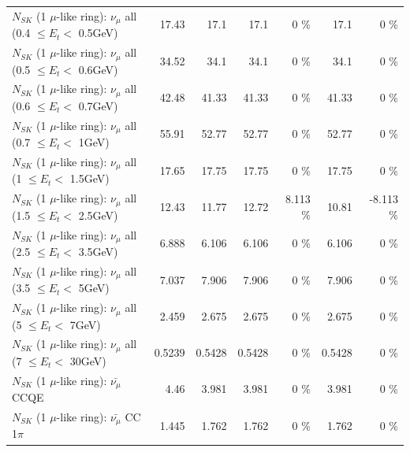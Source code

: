 \begin{table}
\begin{tabular}{| l | r | r | r  r | r  r |}
       $N_{SK}$ (1 $\mu$-like ring): $\nu_{\mu}$ all (0.4 $\leq E_{t} <$ 0.5GeV) &           17.43 &            17.1 &            17.1 &        0 \%  &            17.1 &        0 \%  \\ 
       $N_{SK}$ (1 $\mu$-like ring): $\nu_{\mu}$ all (0.5 $\leq E_{t} <$ 0.6GeV) &           34.52 &            34.1 &            34.1 &        0 \%  &            34.1 &        0 \%  \\ 
       $N_{SK}$ (1 $\mu$-like ring): $\nu_{\mu}$ all (0.6 $\leq E_{t} <$ 0.7GeV) &           42.48 &           41.33 &           41.33 &        0 \%  &           41.33 &        0 \%  \\ 
         $N_{SK}$ (1 $\mu$-like ring): $\nu_{\mu}$ all (0.7 $\leq E_{t} <$ 1GeV) &           55.91 &           52.77 &           52.77 &        0 \%  &           52.77 &        0 \%  \\ 
         $N_{SK}$ (1 $\mu$-like ring): $\nu_{\mu}$ all (1 $\leq E_{t} <$ 1.5GeV) &           17.65 &           17.75 &           17.75 &        0 \%  &           17.75 &        0 \%  \\ 
       $N_{SK}$ (1 $\mu$-like ring): $\nu_{\mu}$ all (1.5 $\leq E_{t} <$ 2.5GeV) &           12.43 &           11.77 &           12.72 &    8.113 \%  &           10.81 &   -8.113 \%  \\ 
       $N_{SK}$ (1 $\mu$-like ring): $\nu_{\mu}$ all (2.5 $\leq E_{t} <$ 3.5GeV) &           6.888 &           6.106 &           6.106 &        0 \%  &           6.106 &        0 \%  \\ 
         $N_{SK}$ (1 $\mu$-like ring): $\nu_{\mu}$ all (3.5 $\leq E_{t} <$ 5GeV) &           7.037 &           7.906 &           7.906 &        0 \%  &           7.906 &        0 \%  \\ 
           $N_{SK}$ (1 $\mu$-like ring): $\nu_{\mu}$ all (5 $\leq E_{t} <$ 7GeV) &           2.459 &           2.675 &           2.675 &        0 \%  &           2.675 &        0 \%  \\ 
          $N_{SK}$ (1 $\mu$-like ring): $\nu_{\mu}$ all (7 $\leq E_{t} <$ 30GeV) &          0.5239 &          0.5428 &          0.5428 &        0 \%  &          0.5428 &        0 \%  \\ 
\hline
\hline
\hline
                              $N_{SK}$ (1 $\mu$-like ring): $\bar{\nu_\mu}$ CCQE &            4.46 &           3.981 &           3.981 &        0 \%  &           3.981 &        0 \%  \\ 
                         $N_{SK}$ (1 $\mu$-like ring): $\bar{\nu_\mu}$ CC 1$\pi$ &           1.445 &           1.762 &           1.762 &        0 \%  &           1.762 &        0 \%  \\ 

\end{tabular}
\end{table}
